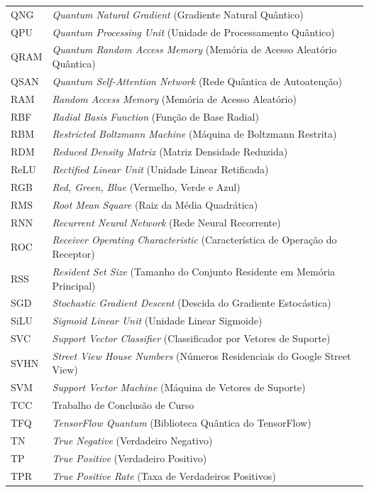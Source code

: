 \documentclass[
    12pt,
    openright,
    oneside,
    a4paper,
    english,
    brazil
]{abntex2}
\begin{document}
\begin{longtable}{@{}p{3.9cm}p{\dimexpr\textwidth-3.9cm-2\tabcolsep\relax}@{}}
QNG & \textit{Quantum Natural Gradient} (Gradiente Natural Quântico) \\
QPU & \textit{Quantum Processing Unit} (Unidade de Processamento Quântico) \\
QRAM & \textit{Quantum Random Access Memory} (Memória de Acesso Aleatório Quântica) \\
QSAN & \textit{Quantum Self-Attention Network} (Rede Quântica de Autoatenção) \\
RAM & \textit{Random Access Memory} (Memória de Acesso Aleatório) \\
RBF & \textit{Radial Basis Function} (Função de Base Radial) \\
RBM & \textit{Restricted Boltzmann Machine} (Máquina de Boltzmann Restrita) \\
RDM & \textit{Reduced Density Matrix} (Matriz Densidade Reduzida) \\
ReLU & \textit{Rectified Linear Unit} (Unidade Linear Retificada) \\
RGB & \textit{Red, Green, Blue} (Vermelho, Verde e Azul) \\
RMS & \textit{Root Mean Square} (Raiz da Média Quadrática) \\
RNN & \textit{Recurrent Neural Network} (Rede Neural Recorrente) \\
ROC & \textit{Receiver Operating Characteristic} (Característica de Operação do Receptor) \\
RSS & \textit{Resident Set Size} (Tamanho do Conjunto Residente em Memória Principal) \\
SGD & \textit{Stochastic Gradient Descent} (Descida do Gradiente Estocástica) \\
SiLU & \textit{Sigmoid Linear Unit} (Unidade Linear Sigmoide) \\
SVC & \textit{Support Vector Classifier} (Classificador por Vetores de Suporte) \\
SVHN & \textit{Street View House Numbers} (Números Residenciais do Google Street View) \\
SVM & \textit{Support Vector Machine} (Máquina de Vetores de Suporte) \\
TCC & Trabalho de Conclusão de Curso \\
TFQ & \textit{TensorFlow Quantum} (Biblioteca Quântica do TensorFlow) \\
TN & \textit{True Negative} (Verdadeiro Negativo) \\
TP & \textit{True Positive} (Verdadeiro Positivo) \\
TPR & \textit{True Positive Rate} (Taxa de Verdadeiros Positivos) \\

\end{longtable}
\end{document}
